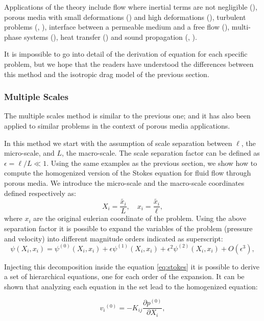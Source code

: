 Applications of the theory include flow where inertial terms are not negligible (\citet{whitaker1996forchheimer}), porous media with small deformations (\citet{whitaker1986flow2}) and high deformations (\citet{hussong2011continuum}), turbulent problems (\citet{soulaine2014}, \citet{breugem2006influence}), interface between a permeable medium and a free flow (\citet{beavers1967boundary}), multi-phase systems (\citet{whitaker1973transport}), heat transfer (\citet{carbonell1984heat}) and sound propagation (\citet{firdaouss1998some}, \citet{lafarge1998sound}).

It is impossible to go into detail of the derivation of equation for each specific problem, but we hope that the readers have understood the differences between this method and the isotropic drag model of the previous section.

\subsubsection{Multiple Scales}

The multiple scales method is similar to the previous one; and it has also been applied to similar problems in the context of porous media applications.

In this method we start with the assumption of scale separation between $\ell$, the micro-scale, and $L$, the macro-scale.
The scale separation factor can be defined as $\epsilon = \ell/L \ll 1$.
Using the same examples as the previous section, we show how to compute the homogenized version of the Stokes equation for fluid flow through porous media.
We introduce the micro-scale and the macro-scale coordinates defined respectively as:
$$
 X_i = \dfrac{\tilde{x_i}}{L}, \quad   x_i = \dfrac{\tilde{x_i}}{\ell},
$$
where $x_i$ are the original eulerian coordinate of the problem.
Using the above separation factor it is possible to expand the variables of the problem (pressure and velocity) into different magnitude orders indicated as superscript:
$$
\psi(X_i, x_i) = \psi^{(0)}(X_i, x_i)  +\epsilon \psi^{(1)}(X_i, x_i) +\epsilon^2 \psi^{(2)}(X_i, x_i) +O(\epsilon^3),
$$

Injecting this decomposition inside the equation \eqref{eq:stokes} it is possible to derive a set of hierarchical equations, one for each order of the expansion.
It can be shown that analyzing each equation in the set lead to the homogenized equation:

\begin{equation}
{v_i}^{(0)} = -K_{ij} \dfrac{\partial p^{(0)}}{\partial X_i},
\label{eq:darcy_ms}
\end{equation} 

